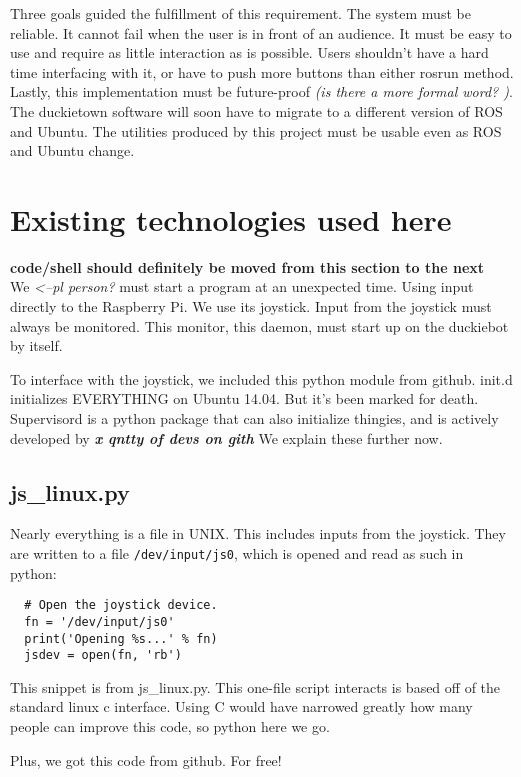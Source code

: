 \documentclass[titlepage]{article}
\begin{document}
Three goals guided the fulfillment of this requirement. The system must be reliable. It cannot fail when the user is in front of an audience. It must be easy to use and require as little interaction as is possible. Users shouldn't have a hard time interfacing with it, or have to push more buttons than either rosrun method. Lastly, this implementation must be future-proof \textit{(is there a more formal word? )}. The duckietown software will soon have to migrate to a different version of ROS and Ubuntu. The utilities produced by this project must be usable even as ROS and Ubuntu change. 
\section{Existing technologies used here} 
\textbf{code/shell should definitely be moved from this section to the next} \\
We \textit{<--pl person?} must start a program at an unexpected time. Using input directly to the Raspberry Pi. We use its joystick. Input from the joystick must always be monitored. This monitor, this daemon, must start up on the duckiebot by itself. 

To interface with the joystick, we included this python module from github. 
init.d initializes EVERYTHING on Ubuntu 14.04. But it's been marked for death.
Supervisord is a python package that can also initialize thingies, and is actively developed by \textbf{\textit{x qntty of devs on gith}}
We explain these further now. 
\subsection{js\_linux.py}
Nearly everything is a file in UNIX. This includes inputs from the joystick. They are written to a file \texttt{/dev/input/js0}, which is opened and read as such in python:


\begin{lstlisting}
  # Open the joystick device.
  fn = '/dev/input/js0'
  print('Opening %s...' % fn)
  jsdev = open(fn, 'rb')
\end{lstlisting}

This snippet is from js\_linux.py. This one-file script interacts is based off of the standard linux c interface. Using C would have narrowed greatly how many people can improve this code, so python here we go. 

Plus, we got this code from github. For free!
\end{document}
